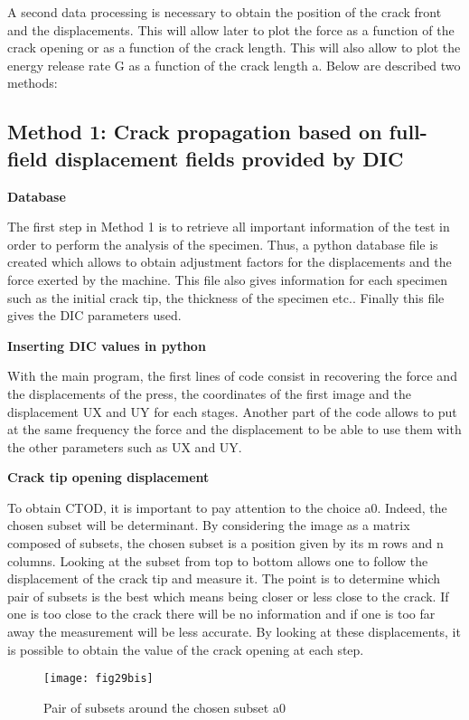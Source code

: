 A second data processing is necessary to obtain the position of the crack front and the displacements. This will allow later to plot the force as a function of the crack opening or as a function of the crack length. This will also allow to plot the energy release rate G as a function of the crack length a. Below are described two methods:

\subsection{Method 1: Crack propagation based on full-field displacement fields provided by DIC}

\textbf{Database}

The first step in Method 1 is to retrieve all important information of the test in order to perform the analysis of the specimen. Thus, a python database file is created which allows to obtain adjustment factors for the displacements and the force exerted by the machine. This file also gives information for each specimen such as the initial crack tip, the thickness of the specimen etc.. Finally this file gives the DIC parameters used.

\textbf{Inserting DIC values in python}

With the main program, the first lines of code consist in recovering the force and the displacements of the press, the coordinates of the first image and the displacement UX and UY for each stages.
Another part of the code allows to put at the same frequency the force and the displacement to be able to use them with the other parameters such as UX and UY.

\textbf{Crack tip opening displacement}

To obtain CTOD, it is important to pay attention to the choice a0. Indeed, the chosen subset will be determinant. By considering the image as a matrix composed of subsets, the chosen subset is a position given by its m rows and n columns. Looking at the subset from top to bottom allows one to follow the displacement of the crack tip and measure it. The point is to determine which pair of subsets is the best which means being closer or less close to the crack. If one is too close to the crack there will be no information and if one is too far away the measurement will be less accurate. By looking at these displacements, it is possible to obtain the value of the crack opening at each step.

\begin{figure}[htp]
	\centering
	\texttt{[image: fig29bis]}
	\caption{Pair of subsets around the chosen subset a0}
	\label{fig:fig29bis}
\end{figure}

